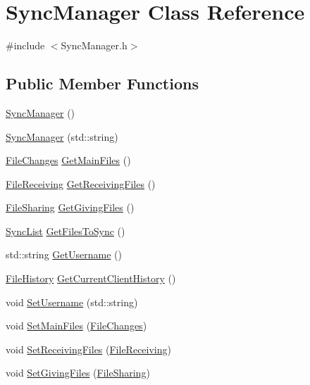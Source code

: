 \hypertarget{classSyncManager}{\section{Sync\-Manager Class Reference}
\label{classSyncManager}
}


{\ttfamily \#include $<$Sync\-Manager.\-h$>$}

\subsection*{Public Member Functions}
\begin{DoxyCompactItemize}
\item 
\hyperlink{classSyncManager_a798490a023b00c06374a8bfca6ca3b3e}{Sync\-Manager} ()
\item 
\hyperlink{classSyncManager_a687eba7242d20a22c606752abeaa3c81}{Sync\-Manager} (std\-::string)
\item 
\hyperlink{classFileChanges}{File\-Changes} \hyperlink{classSyncManager_a02e2c344e0ffd4cd724218bff45b3db0}{Get\-Main\-Files} ()
\item 
\hyperlink{classFileReceiving}{File\-Receiving} \hyperlink{classSyncManager_aab02f63ccd64843c9a760239dfdc3c20}{Get\-Receiving\-Files} ()
\item 
\hyperlink{classFileSharing}{File\-Sharing} \hyperlink{classSyncManager_add07d5a453ebcd3b54c584fd54531898}{Get\-Giving\-Files} ()
\item 
\hyperlink{structSyncList}{Sync\-List} \hyperlink{classSyncManager_aa101e6e2761a488152b0f957eb7106e9}{Get\-Files\-To\-Sync} ()
\item 
std\-::string \hyperlink{classSyncManager_aedbc56ae43db8a7ad02edcea7f28231d}{Get\-Username} ()
\item 
\hyperlink{classFileHistory}{File\-History} \hyperlink{classSyncManager_a6523b8ccdec0a4500307003eba247359}{Get\-Current\-Client\-History} ()
\item 
void \hyperlink{classSyncManager_abf75d9109e662f3fb957591ff34902e1}{Set\-Username} (std\-::string)
\item 
void \hyperlink{classSyncManager_a9499a28afa307f8707e494275d82b3a4}{Set\-Main\-Files} (\hyperlink{classFileChanges}{File\-Changes})
\item 
void \hyperlink{classSyncManager_a4c4530a25de176b3f23bdf4fb3c590af}{Set\-Receiving\-Files} (\hyperlink{classFileReceiving}{File\-Receiving})
\item 
void \hyperlink{classSyncManager_a6e90738b7ef513538f38cd1b41f88e9f}{Set\-Giving\-Files} (\hyperlink{classFileSharing}{File\-Sharing})

\end{DoxyCompactItemize}
